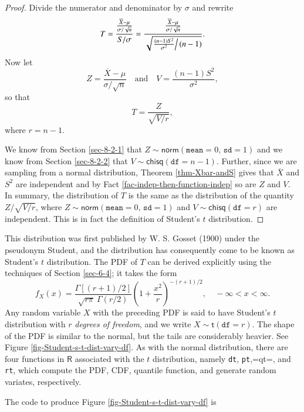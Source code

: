 \documentclass[captions=tableheading]{scrbook}
\begin{document}
\begin{proof}
Divide the numerator and denominator by \(\sigma\) and rewrite
\[
T=\frac{\frac{\overline{X}-\mu}{\sigma/\sqrt{n}}}{S/\sigma}=\frac{\frac{\overline{X}-\mu}{\sigma/\sqrt{n}}}{\sqrt{\left.\frac{(n-1)S^{2}}{\sigma^{2}}\right/ (n-1)}}.
\]
Now let 
\[
Z=\frac{\overline{X}-\mu}{\sigma/\sqrt{n}}\quad\mbox{and}\quad V=\frac{(n-1)S^{2}}{\sigma^{2}},
\]
so that
\begin{equation}
T=\frac{Z}{\sqrt{V/r}},
\end{equation}
where \(r=n-1\).

We know from Section \ref{sec-8-2-1} that \(Z\sim\mathsf{norm}(\mathtt{mean}=0,\,\mathtt{sd}=1)\) and we know from Section \ref{sec-8-2-2} that \(V\sim\mathsf{chisq}(\mathtt{df}=n-1)\). Further, since we are sampling from a normal distribution, Theorem \ref{thm-Xbar-andS} gives that \(\overline{X}\) and \(S^{2}\) are independent and by Fact \ref{fac-indep-then-function-indep} so are \(Z\) and \(V\). In summary, the distribution of \(T\) is the same as the distribution of the quantity \(Z/\sqrt{V/r}\), where \(Z\sim\mathsf{norm}(\mathtt{mean}=0,\,\mathtt{sd}=1)\) and \(V\sim\mathsf{chisq}(\mathtt{df}=r)\) are independent. This is in fact the definition of Student's \(t\) distribution.
\end{proof}

This distribution was first published by W. S. Gosset (1900) under the pseudonym Student, and the distribution has consequently come to be known as Student's \(t\) distribution. The PDF of \(T\) can be derived explicitly using the techniques of Section \ref{sec-6-4}; it takes the form 
\begin{equation}
f_{X}(x)=\frac{\Gamma[(r+1)/2]}{\sqrt{r\pi}\ \Gamma(r/2)}\left(1+\frac{x^{2}}{r}\right)^{-(r+1)/2},\quad-\infty<x<\infty.
\end{equation}
Any random variable \(X\) with the preceding PDF is said to have Student's \(t\) distribution with \(r\) \emph{degrees of freedom}, and we write \(X\sim\mathsf{t}(\mathtt{df}=r)\). The shape of the PDF is similar to the normal, but the tails are considerably heavier. See Figure \ref{fig-Student-s-t-dist-vary-df}. As with the normal distribution, there are four functions in \(\mathsf{R}\) associated with the \(t\) distribution, namely \texttt{dt}, \texttt{pt},=qt=, and \texttt{rt}, which compute the PDF, CDF, quantile function, and generate random variates, respectively.


The code to produce Figure \ref{fig-Student-s-t-dist-vary-df} is
\end{document}
